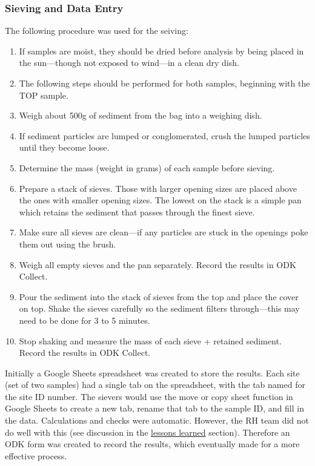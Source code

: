 \documentclass[a4paper,12pt,twoside]{article}
\begin{document}
\newpage
\color{RHblue}
\subsubsection{Sieving and Data Entry}
\color{RHgrey}
The following procedure was used for the seiving:

\begin{enumerate}
  \item If samples are moist, they should be dried before analysis by being placed in the sun---though not exposed to wind---in a clean dry dish. 
  \item The following steps should be performed for both samples, beginning with the TOP sample.
  \item Weigh about 500g of sediment from the bag into a weighing dish.
  \item If sediment particles are lumped or conglomerated, crush the lumped particles until they become loose.
  \item Determine the mass (weight in grams) of each sample before sieving.
  \item Prepare a stack of sieves. Those with larger opening sizes are placed above the ones with smaller opening sizes. The lowest on the stack is a simple pan which retains the sediment that passes through the finest sieve.
  \item Make sure all sieves are clean---if any particles are stuck in the openings poke them out using the brush.
  \item Weigh all empty sieves and the pan separately. Record the results in ODK Collect.
  \item Pour the sediment into the stack of sieves from the top and place the cover on top. Shake the sieves carefully so the sediment filters through---this may need to be done for 3 to 5 minutes.
  \item Stop shaking and measure the mass of each sieve + retained sediment. Record the results in ODK Collect.
\end{enumerate}

Initially a Google Sheets spreadsheet was created to store the results. Each site (set of two samples) had a single tab on the spreadsheet, with the tab named for the site ID number. The sievers would use the move or copy sheet function in Google Sheets to create a new tab, rename that tab to the sample ID, and fill in the data. Calculations and checks were automatic. However, the RH team did not do well with this (see discussion in the \hyperlink{lessonslearned}{lessons learned} section). Therefore an ODK form was created to record the results, which eventually made for a more effective process. 
\end{document}
